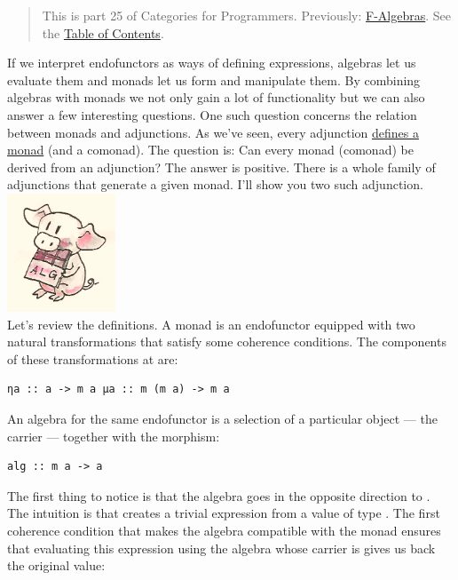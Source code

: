 \begin{quote}
This is part 25 of Categories for Programmers. Previously:
\href{https://bartoszmilewski.com/2017/02/28/f-algebras/}{F-Algebras}.
See the
\href{https://bartoszmilewski.com/2014/10/28/category-theory-for-programmers-the-preface/}{Table
of Contents}.
\end{quote}

If we interpret endofunctors as ways of defining expressions, algebras
let us evaluate them and monads let us form and manipulate them. By
combining algebras with monads we not only gain a lot of functionality
but we can also answer a few interesting questions. One such question
concerns the relation between monads and adjunctions. As we've seen,
every adjunction
\href{https://bartoszmilewski.com/2016/12/27/monads-categorically/}{defines
a monad} (and a comonad). The question is: Can every monad (comonad) be
derived from an adjunction? The answer is positive. There is a whole
family of adjunctions that generate a given monad. I'll show you two
such adjunction.\\
\includegraphics[width=1.27083in]{images/pigalg.png}\\
Let's review the definitions. A monad is an endofunctor 
equipped with two natural transformations that satisfy some coherence
conditions. The components of these transformations at  are:

\begin{verbatim}
ηa :: a -> m a μa :: m (m a) -> m a
\end{verbatim}

An algebra for the same endofunctor is a selection of a particular
object --- the carrier  --- together with the morphism:

\begin{verbatim}
alg :: m a -> a
\end{verbatim}

The first thing to notice is that the algebra goes in the opposite
direction to . The intuition is that  creates a
trivial expression from a value of type . The first coherence
condition that makes the algebra compatible with the monad ensures that
evaluating this expression using the algebra whose carrier is 
gives us back the original value:

